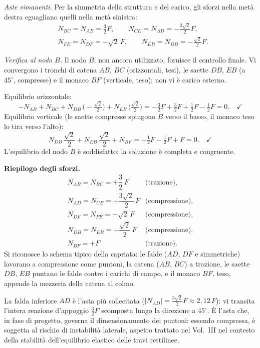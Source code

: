 \begin{esempio}
\begin{svolgimento}
		\textit{Aste rimanenti.}
		Per la simmetria della struttura e del carico, gli
		sforzi nella metà destra eguagliano quelli nella
		metà sinistra:
	\[
	\begin{aligned}
		&N_{BC} = N_{AB} = \frac{3}{2}F, \qquad
		N_{CE} = N_{AD} = -\frac{3\sqrt2}{2}F, \\[4pt]
		&N_{FE} = N_{DF} = -\sqrt2\,F, \qquad
		N_{EB} = N_{DB} = -\frac{\sqrt2}{2}F.
	\end{aligned}
	\]
		
		\textit{Verifica al nodo $B$.}
		Il nodo $B$, non ancora utilizzato, fornisce il
		controllo finale. Vi convergono i tronchi di catena
		$AB$, $BC$ (orizzontali, tesi), le saette $DB$, $EB$
		(a $45^\circ$, compresse) e il monaco $BF$ (verticale,
		teso); non vi è carico esterno.
		
		Equilibrio orizzontale:
		\[
		-N_{AB} + N_{BC}
		+ N_{DB}\,\Big(\!-\tfrac{\sqrt2}{2}\Big)
		+ N_{EB}\,\Big(\tfrac{\sqrt2}{2}\Big)
		= -\tfrac{3}{2}F + \tfrac{3}{2}F
		+ \tfrac{1}{2}F - \tfrac{1}{2}F = 0. \quad\checkmark
		\]
		Equilibrio verticale (le saette compresse spingono
		$B$ verso il basso, il monaco teso lo tira verso
		l'alto):
		\[
		N_{DB}\,\frac{\sqrt2}{2} + N_{EB}\,\frac{\sqrt2}{2}
		+ N_{BF}
		= -\tfrac{1}{2}F - \tfrac{1}{2}F + F = 0. \quad\checkmark
		\]
		L'equilibrio del nodo $B$ è soddisfatto: la soluzione
		è completa e congruente.
		
		\noindent\textbf{Riepilogo degli sforzi.}
		\[
		\begin{array}{lll}
			N_{AB} = N_{BC} = +\dfrac{3}{2}\,F
			& \text{(trazione)}, \\[8pt]
			N_{AD} = N_{CE} = -\dfrac{3\sqrt2}{2}\,F
			& \text{(compressione)}, \\[8pt]
			N_{DF} = N_{FE} = -\sqrt2\,F
			& \text{(compressione)}, \\[8pt]
			N_{DB} = N_{EB} = -\dfrac{\sqrt2}{2}\,F
			& \text{(compressione)}, \\[8pt]
			N_{BF} = +F
			& \text{(trazione)}.
		\end{array}
		\]
		Si riconosce lo schema tipico della capriata: le falde
		($AD$, $DF$ e simmetriche) lavorano a compressione
		come puntoni, la catena ($AB$, $BC$) a trazione, le
		saette $DB$, $EB$ puntano le falde contro i carichi
		di campo, e il monaco $BF$, teso, appende la mezzeria
		della catena al colmo.
		\begin{oss}
			La falda inferiore $AD$ è l'asta più sollecitata
			($\lvert N_{AD}\rvert = \tfrac{3\sqrt2}{2}F
			\approx 2{,}12\,F$): vi transita l'intera reazione
			d'appoggio $\tfrac{3}{2}F$ scomposta lungo la
			direzione a $45^\circ$. È l'asta che, in fase di
			progetto, governa il dimensionamento dei puntoni:
			essendo compressa, è soggetta al rischio di
			instabilità laterale, aspetto trattato nel Vol.~III
			nel contesto della stabilità dell'equilibrio
			elastico delle travi rettilinee.
		\end{oss}
	\end{svolgimento}
\end{esempio}


